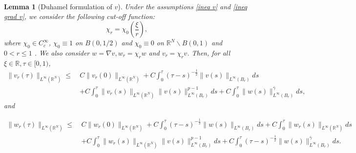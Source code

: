 \documentclass[11pt,a4paper]{article}
\newcommand{\1}{\mathbbm{1}}
\numberwithin{equation}{section}
\newcommand{\numberset}{\mathbb}
\newcommand{\R}{\numberset{R}}
\newtheorem{lemma}{Lemma}[section]
\theoremstyle{remark}
\begin{document}
\begin{lemma}[Duhamel formulation of $v$]\label{duhamel bound v & nabla v}
Under the assumptions \eqref{ineq v} and \eqref{ineq grad v}, we consider the following cut-off function:
$$\chi_r=\chi_0\left(\frac{\xi}{r}\right),$$
where $\chi_0\in C^\infty_c$, $\chi_0\equiv 1$ on $B(0,1/2)$ and $\chi_0 \equiv 0$ on $\R^N \backslash B(0,1)$ and $0<r\leq 1$ . We also consider $w=\nabla v,w_r= \chi_r w$ and $v_r=\chi_r v$. Then, for all $\xi \in \R, \tau \in [0,1)$,
\begin{equation}\label{duhamel bound v}
\begin{split}
\| v_r(\tau)\|_{L^\infty(\R^N)}\leq\ & C\| v_r(0)\|_{L^\infty(\R^N)}+C\int^\tau_0 (\tau-s)^{-\frac{1}{2}}\|v(s)\|_{L^\infty(B_r)}ds\\
&+ C\int^\tau_0 \|v_r(s)\|_{L^\infty(\R^N)}\|v(s)\|_{L^\infty(B_r)}^{p-1}ds+C\int^\tau_0\|w(s)\|^{\bar \gamma}_{L^\infty(B_r)}ds,
\end{split}
\end{equation}
and 

\begin{equation}\label{duhamel bound nabla v}
\begin{split}
\| w_r(\tau)\|_{L^\infty(\R^N)}\leq\ & C\| w_r(0)\|_{L^\infty(\R^N)}+C\int^\tau_0 (\tau-s)^{-\frac{1}{2}}\|w(s)\|_{L^\infty(B_r)}ds+C\int^\tau_0\|w_r(s)\|_{L^\infty(\R^N)}ds\\
&+C\int^\tau_0\|w_r(s)\|_{L^\infty(\R^N)}\|v(s)\|^{p-1}_{L^\infty(B_r)}ds+C\int^\tau_0(\tau-s)^{-\frac{1}{2}}\|w(s)\|^{\bar{\gamma}}_{L^\infty(B_r)}ds.
\end{split}
\end{equation}



\end{lemma}
\end{document}
